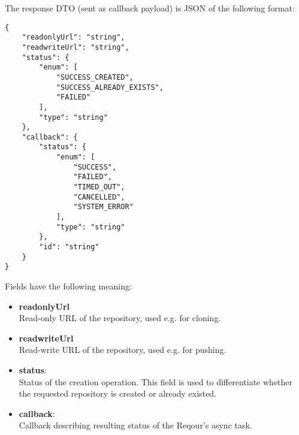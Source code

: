 \documentclass[../main.tex]{subfiles}
\begin{document}
The response DTO (sent as callback payload) is JSON of the following format:
\begin{lstlisting}[numbers=none]
{
    "readonlyUrl": "string",
    "readwriteUrl": "string",
    "status": {
        "enum": [
            "SUCCESS_CREATED",
            "SUCCESS_ALREADY_EXISTS",
            "FAILED"
        ],
        "type": "string"
    },
    "callback": {
        "status": {
            "enum": [
                "SUCCESS",
                "FAILED",
                "TIMED_OUT",
                "CANCELLED",
                "SYSTEM_ERROR"
            ],
            "type": "string"
        },
        "id": "string"
    }
}
\end{lstlisting}

Fields have the following meaning:
\begin{itemize}
    \item \textbf{readonlyUrl}\\
    Read-only URL of the repository, used e.g. for cloning.

    \item \textbf{readwriteUrl}\\
    Read-write URL of the repository, used e.g. for pushing.

    \item \textbf{status}:\\
    Status of the creation operation. This field is used to differentiate whether the requested repository is created or already existed.

    \item \textbf{callback}:\\
    Callback describing resulting status of the Reqour's async task.
\end{itemize}
\end{document}

